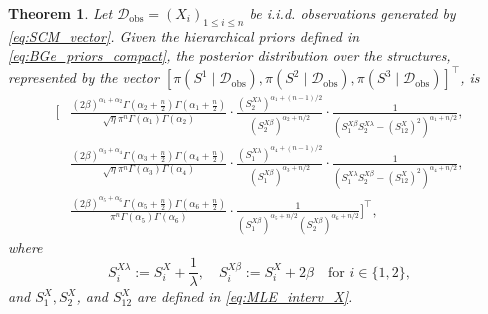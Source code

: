 \documentclass[accepted]{uai2026} %
\newcommand{\train}{\mathcal{D}}
\newcommand{\obsdata}{\train_{\text{obs}}}
\def\transpose{\intercal}
\theoremstyle{boldremark}
\newtheorem{theorem}{Theorem}[section]
\begin{document}
\begin{theorem}
    \label{thm:BGe_nonindent}
    Let $\obsdata = (X_i)_{1\leq i\leq n}$ be i.i.d. observations generated by \eqref{eq:SCM_vector}. Given the hierarchical priors defined in \eqref{eq:BGe_priors_compact}, the posterior distribution over the structures, represented by the vector $[\pi(S^1 \mid \obsdata), \pi(S^2 \mid \obsdata), \pi(S^3 \mid \obsdata)]^\transpose$, is
    \begin{align*}
        \Bigg[ 
        & \frac{(2\beta)^{\alpha_1+\alpha_2} \Gamma(\alpha_2+\frac{n}{2})\Gamma(\alpha_1+\frac{n}{2})}{\sqrt{\eta} \pi^n \Gamma(\alpha_1)\Gamma(\alpha_2)} \cdot \frac{(S_2^{X\lambda})^{\alpha_1+(n-1)/2}}{(S_2^{X\beta})^{\alpha_2+n/2}} \cdot \frac{1}{(S_1^{X\beta} S_2^{X\lambda} - (S_{12}^X)^2)^{\alpha_1+n/2}}, \\
        & \frac{(2\beta)^{\alpha_3+\alpha_4} \Gamma(\alpha_3+\frac{n}{2})\Gamma(\alpha_4+\frac{n}{2})}{\sqrt{\eta} \pi^n \Gamma(\alpha_3)\Gamma(\alpha_4)} \cdot \frac{(S_1^{X\lambda})^{\alpha_4+(n-1)/2}}{(S_1^{X\beta})^{\alpha_3+n/2}} \cdot \frac{1}{(S_1^{X\lambda} S_2^{X\beta} - (S_{12}^X)^2)^{\alpha_4+n/2}}, \\
        & \frac{(2\beta)^{\alpha_5+\alpha_6} \Gamma(\alpha_5+\frac{n}{2})\Gamma(\alpha_6+\frac{n}{2})}{\pi^n \Gamma(\alpha_5)\Gamma(\alpha_6)} \cdot \frac{1}{(S_1^{X\beta})^{\alpha_5+n/2}(S_2^{X\beta})^{\alpha_6+n/2}} 
        \Bigg]^\transpose,
    \end{align*}
    where 
    \begin{equation}
        S_i^{X\lambda} := S_{i}^X + \frac{1}{\lambda}, \quad S_{i}^{X\beta} := S_{i}^X + 2\beta \quad \text{for } i \in \{1, 2\},
        \label{eq:def_S_beta_eta}
    \end{equation}
    and $S_1^X, S_2^X$, and $S_{12}^X$ are defined in \eqref{eq:MLE_interv_X}.
\end{theorem}
\end{document}
